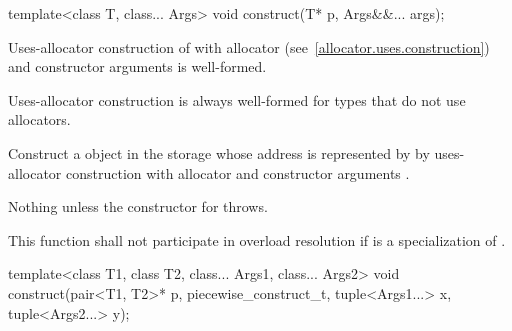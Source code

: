 %
\begin{itemdecl}
template<class T, class... Args>
  void construct(T* p, Args&&... args);
\end{itemdecl}

\begin{itemdescr}
\pnum
\requires
Uses-allocator construction of 
with allocator  (see~\ref{allocator.uses.construction})
and constructor arguments  is well-formed.
\begin{note}
Uses-allocator construction is always well-formed
for types that do not use allocators.\end{note}

\pnum
\effects
Construct a  object in the storage
whose address is represented by 
by uses-allocator construction with allocator 
and constructor arguments .

\pnum
\throws
Nothing unless the constructor for  throws.

\pnum
\remarks
This function shall not participate in overload resolution if
 is a specialization of .
\end{itemdescr}

%
\begin{itemdecl}
template<class T1, class T2, class... Args1, class... Args2>
  void construct(pair<T1, T2>* p, piecewise_construct_t, tuple<Args1...> x, tuple<Args2...> y);
\end{itemdecl}

